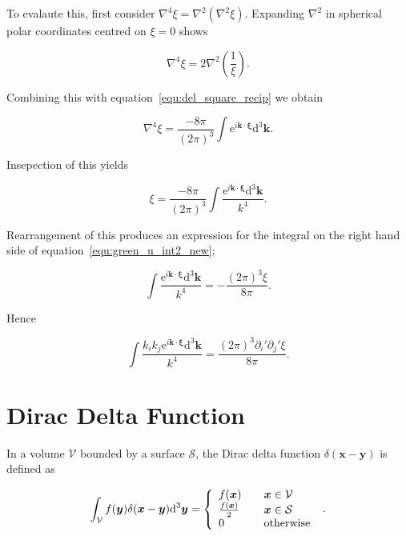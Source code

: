 \documentclass[12pt]{article}
\begin{document}
To evalaute this, first consider $\nabla^{4} \xi = \nabla^{2}(\nabla^{2} \xi)$. Expanding $\nabla^{2}$ in spherical polar coordinates centred on $\xi = 0$ shows

\begin{equation}
\label{equ:del4}
\nabla^{4} \xi = 2 \nabla^{2} \left(\frac{1}{\xi}\right) .
\end{equation}

Combining this with equation~\ref{equ:del_square_recip} we obtain

\begin{equation}
\label{equ:del4_int}
\nabla^{4} \xi = \frac{-8 \pi}{(2 \pi)^{3}} \int \mathrm{e}^{i \boldsymbol{k} \cdot \boldsymbol{\xi}} \mathrm{d}^{3} \boldsymbol{k} .
\end{equation}

Insepection of this yields

\begin{equation}
\label{equ:del4_int_int}
\xi = \frac{-8 \pi}{(2 \pi)^{3}} \int \frac{\mathrm{e}^{i \boldsymbol{k} \cdot \boldsymbol{\xi}} \mathrm{d}^{3} \boldsymbol{k}}{k^{4}} .
\end{equation}

Rearrangement of this produces an expression for the integral on the right hand side of equation~\ref{equ:green_u_int2_new};

\begin{equation}
\label{equ:green_u_int2_new_express}
\int \frac{\mathrm{e}^{i \boldsymbol{k} \cdot \boldsymbol{\xi}} \mathrm{d}^{3} \boldsymbol{k}}{k^{4}} = -\frac{(2 \pi)^{3} \xi}{8 \pi} .
\end{equation}

Hence

\begin{equation}
\label{equ:green_u_int2}
\int \frac{k_{i} k_{j} \mathrm{e}^{i \boldsymbol{k} \cdot \boldsymbol{\xi}} \mathrm{d}^{3} \boldsymbol{k}}{k^{4}} = \frac{(2 \pi)^{3} \partial_{i}' \partial_{j}' \xi}{8 \pi} .
\end{equation}

\section{Dirac Delta Function}
\label{app:delta}

In a volume $\mathcal{V}$ bounded by a surface $\mathcal{S}$, the Dirac delta function $\delta(\boldsymbol{x} - \boldsymbol{y})$ is defined as \citep{Riley06}

\begin{equation}
\label{equ:dirac}
\int_{\mathcal{V}} f(\boldsymbol{y}) \delta(\boldsymbol{x} - \boldsymbol{y}) \mathrm{d}^{3} \boldsymbol{y} = \left\{
    \begin{array}{l l}
      f(\boldsymbol{x}) &\quad \boldsymbol{x} \in \mathcal{V} \\
      \frac{f(\boldsymbol{x})}{2} &\quad \boldsymbol{x} \in \mathcal{S} \\
      0 & \quad \text{otherwise}
\end{array}
\right.\ .
\end{equation}
\end{document}
